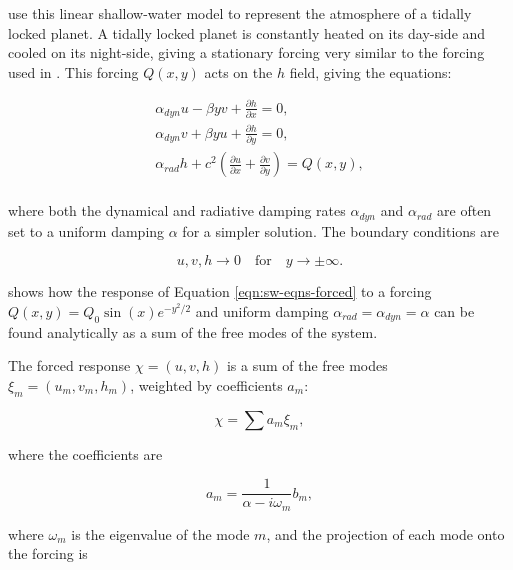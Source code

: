 \citet{showman2011superrotation} use this linear shallow-water model to represent the atmosphere of a tidally locked planet. A tidally locked planet is constantly heated on its day-side and cooled on its night-side, giving a stationary forcing very similar  to the forcing used in \citet{matsuno1966quasi}. This forcing $Q(x,y)$ acts on the $h$ field, giving the equations:

\begin{equation}\label{eqn:sw-eqns-forced}
  \begin{gathered}
    \alpha_{dyn} u - \beta y v +\frac{\partial h}{\partial x} = 0, \\
    \alpha_{dyn} v + \beta y u + \frac{\partial h}{\partial y} = 0, \\
    \alpha_{rad} h + c^{2}(\frac{\partial u}{\partial x} + \frac{\partial v}{\partial y}) = Q(x,y), \\
  \end{gathered}
\end{equation}

where both the dynamical and radiative damping rates $\alpha_{dyn}$ and $\alpha_{rad}$ are often set to a uniform damping $\alpha$ for a simpler solution. The boundary conditions are

\begin{equation}
  u , v , h \rightarrow 0 \quad \mathrm{for} \quad y \rightarrow \pm \infty.
\end{equation}

\citet{matsuno1966quasi} shows how the response of Equation \ref{eqn:sw-eqns-forced} to a forcing $Q(x,y) = Q_{0} \sin(x) e^{-y^{2}/2}$ and uniform damping $\alpha_{rad}=\alpha_{dyn}=\alpha$ can be found analytically as a sum of the free modes of the system.

The forced response $\chi = (u,v,h)$ is a sum of the free modes $\xi_{m}=(u_{m},v_{m},h_{m})$, weighted by coefficients $a_{m}$:

\begin{equation}
  \chi = \sum a _ { m } \xi _ { m },
\end{equation}

where the coefficients are

\begin{equation}
  a _ { m } = \frac { 1 } { \alpha - i \omega _ { m } } b _ { m },
\end{equation}

where $\omega_{m}$ is the eigenvalue of the mode $m$, and the projection of each mode onto the forcing is

